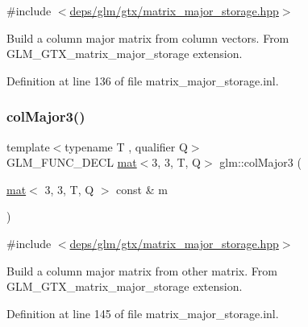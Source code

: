 {\ttfamily \#include $<$\hyperlink{matrix__major__storage_8hpp}{deps/glm/gtx/matrix\+\_\+major\+\_\+storage.\+hpp}$>$}

Build a column major matrix from column vectors. From G\+L\+M\+\_\+\+G\+T\+X\+\_\+matrix\+\_\+major\+\_\+storage extension. 

Definition at line 136 of file matrix\+\_\+major\+\_\+storage.\+inl.

\mbox{\label{group__gtx__matrix__major__storage_ga86bd0656e787bb7f217607572590af27}} 
\subsubsection{\texorpdfstring{col\+Major3()}{colMajor3()}\hspace{0.1cm}{\footnotesize\ttfamily [2/2]}}
{\footnotesize\ttfamily template$<$typename T , qualifier Q$>$ \\
G\+L\+M\+\_\+\+F\+U\+N\+C\+\_\+\+D\+E\+CL \hyperlink{structglm_1_1mat}{mat}$<$3, 3, T, Q$>$ glm\+::col\+Major3 (\begin{DoxyParamCaption}\item[{\hyperlink{structglm_1_1mat}{mat}$<$ 3, 3, T, Q $>$ const \&}]{m }\end{DoxyParamCaption})}



{\ttfamily \#include $<$\hyperlink{matrix__major__storage_8hpp}{deps/glm/gtx/matrix\+\_\+major\+\_\+storage.\+hpp}$>$}

Build a column major matrix from other matrix. From G\+L\+M\+\_\+\+G\+T\+X\+\_\+matrix\+\_\+major\+\_\+storage extension. 

Definition at line 145 of file matrix\+\_\+major\+\_\+storage.\+inl.

\mbox{\label{group__gtx__matrix__major__storage_gaf4aa6c7e17bfce41a6c13bf6469fab05}} 
